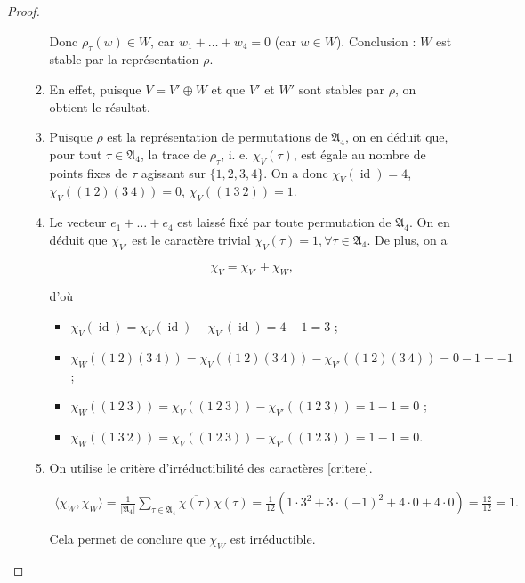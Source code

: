 \documentclass[french]{book}
\theoremstyle{definition}
\theoremstyle{remark}
\begin{document}
\begin{proof}
\begin{enumerate}
\begin{enumerate}
      Donc \(\rho _{\tau}(w) \in W\), car \(w_1 + \dots + w_4 = 0\) (car \(w \in W\)). Conclusion : \(W\) est stable par la représentation \(\rho\).
      \item En effet, puisque \(V = V' \oplus W\) et que \(V'\) et \(W'\) sont stables par \(\rho\), on obtient le résultat.
      \item Puisque \(\rho\) est la représentation de permutations de \(\mathfrak{A}_{4}\), on en déduit que, pour tout \(\tau \in \mathfrak{A}_{4}\), la trace de \(\rho _{\tau}\), i. e. \(\chi_V(\tau)\), est égale au nombre de points fixes de \(\tau\) agissant sur \(\{ 1, 2, 3, 4 \}\). On a donc \(\chi_V(\operatorname{id}) = 4\), \(\chi_V((1 \ 2)(3 \ 4)) = 0\), \(\chi_V((1 \ 3 \ 2)) = 1\).
      \item Le vecteur \(e_1 + \dots + e_4\) est laissé fixé par toute permutation de \(\mathfrak{A}_{4}\). On en déduit que \(\chi _{V'}\) est le caractère trivial \(\chi_V(\tau) = 1, \forall \tau \in \mathfrak{A}_{4}\). De plus, on a

      \[\chi_V = \chi _{V'} + \chi_W,\]

      d'où

      \begin{itemize}
        \item \(\chi_V(\operatorname{id}) = \chi_V(\operatorname{id}) - \chi _{V'}(\operatorname{id}) = 4-1 = 3\) ;
        \item \(\chi_W((1 \ 2) (3 \ 4)) = \chi_V((1 \ 2) (3 \ 4)) - \chi _{V'}((1 \ 2) (3 \ 4)) = 0 -1 = -1\) ;
        \item \(\chi_W ((1 \ 2 \ 3)) = \chi _{V}((1 \ 2 \ 3)) - \chi _{V'}((1 \ 2 \ 3)) = 1 - 1 = 0\) ;
        \item \(\chi_W ((1 \ 3 \ 2)) = \chi_V((1 \ 2 \ 3)) - \chi _{V'}((1 \ 2 \ 3)) = 1 - 1 = 0\).
      \end{itemize}

      \item On utilise le critère d'irréductibilité des caractères \ref{critere}.

      \begin{gather*}
        \langle \chi_W, \chi_W \rangle = \frac{1}{\left\lvert \mathfrak{A}_{4} \right\rvert} \sum_{\tau \in \mathfrak{A}_{4}} \overline{\chi(\tau)} \chi(\tau) = \frac{1}{12}(1 \cdot 3^2 + 3 \cdot (-1)^2 + 4 \cdot 0 + 4 \cdot 0) = \frac{12}{12}=1.
      \end{gather*}

      Cela permet de conclure que \(\chi_W\) est irréductible.
      \end{enumerate}
  \end{enumerate}
\end{proof}
\end{document}

